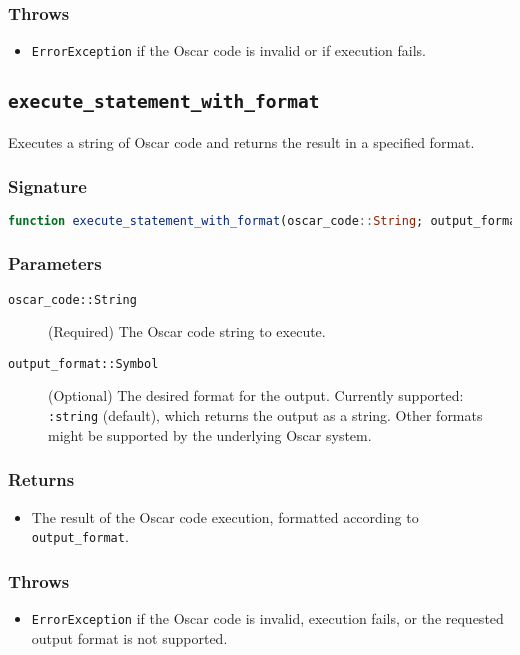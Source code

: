 \documentclass[11pt,a4paper]{article}
\newcommand{\code}[1]{\texttt{#1}}
\newcommand{\func}[1]{\texttt{#1}}
\providecommand{\code}[1]{\texttt{\color{blue!70!black}#1}}
\begin{document}
\subsubsection*{Throws}
\begin{itemize}
    \item \code{ErrorException} if the Oscar code is invalid or if execution fails.
\end{itemize}


\subsection{\func{execute\_statement\_with\_format}}
\label{func:execute_statement_with_format}

Executes a string of Oscar code and returns the result in a specified format.

\subsubsection*{Signature}
\begin{lstlisting}[language=Julia]
function execute_statement_with_format(oscar_code::String; output_format=:string)
\end{lstlisting}

\subsubsection*{Parameters}
\begin{description}
    \item[\code{oscar\_code::String}] (Required) The Oscar code string to execute.
    \item[\code{output\_format::Symbol}] (Optional) The desired format for the output. Currently supported: \code{:string} (default), which returns the output as a string. Other formats might be supported by the underlying Oscar system.
\end{description}

\subsubsection*{Returns}
\begin{itemize}
    \item The result of the Oscar code execution, formatted according to \code{output\_format}.
\end{itemize}

\subsubsection*{Throws}
\begin{itemize}
    \item \code{ErrorException} if the Oscar code is invalid, execution fails, or the requested output format is not supported.
\end{itemize}
\end{document}
